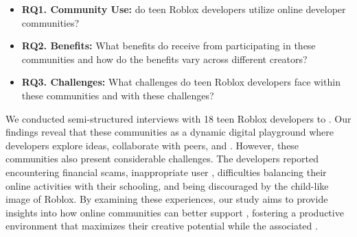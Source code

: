 
\begin{itemize}
    \item \textbf{RQ1. Community Use:}  do teen Roblox developers utilize online developer communities? 
    \item \textbf{RQ2. Benefits:} What benefits do  receive from participating in these communities and how do the benefits vary across different creators?
    \item \textbf{RQ3. Challenges:} What challenges do teen Roblox developers face within these communities and  with these challenges?
\end{itemize}


We conducted semi-structured interviews with 18 teen Roblox developers to . Our findings reveal that these communities  as a dynamic digital playground where  developers explore ideas, collaborate with peers, and . However, these communities also present considerable challenges. The  developers reported encountering financial scams, inappropriate user , difficulties balancing their online activities with their schooling, and being discouraged by the  child-like image of Roblox. By examining these experiences, our study aims to provide insights into how online communities can better support , fostering a productive environment that maximizes their creative potential while  the associated .
